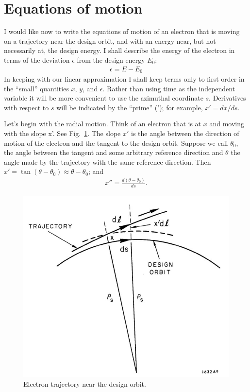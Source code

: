 \section{Equations of motion}\label{sec:2.3}
I would like now to write the equations of motion of an electron that is moving on a trajectory near the design orbit, and with an energy near, but not necessarily at, the design energy. I shall describe the energy of the electron in terms of the deviation $\epsilon$ from the design energy $E_0$:
\begin{align}
	\epsilon = E-E_0
\end{align}
In keeping with our linear approximation I shall keep terms only to first order in the ``small'' quantities $x$, $y$, and $\epsilon$. Rather than using time as the independent variable it will be more convenient to use the azimuthal coordinate $s$. Derivatives with respect to $s$ will be indicated by the ``prime'' ('); for example, $x' = dx/ds$.

Let’s begin with the radial motion. Think of an electron that is at $x$ and moving with the slope x’. See Fig.~\ref{fig:fig9}. The slope $x'$ is the angle between the direction of motion of the electron and the tangent to the design orbit. Suppose we call $\theta_0$, the angle between the tangent and some arbitrary reference direction and $\theta$ the angle made by the trajectory with the same reference direction. Then $x' = \tan(\theta - \theta_0) \approx \theta - \theta_0$; and
\begin{align} \label{eq:2.12}
	x'' = \frac{d(\theta-\theta_0)}{ds}.
\end{align}

\begin{figure}[!htb]
	\centering
	\includegraphics[width=0.6\linewidth]{./Figuras/fig09.jpeg}
	\caption{Electron trajectory near the design orbit.}
	\label{fig:fig9}
\end{figure}

